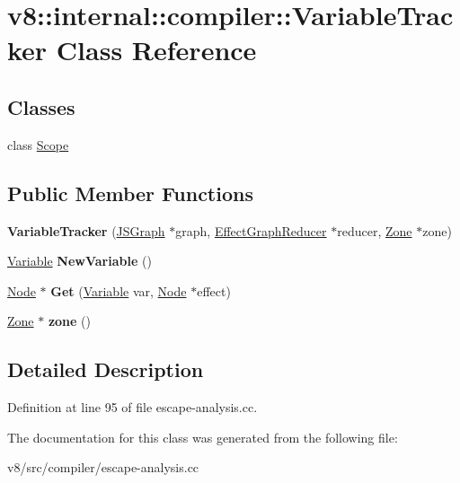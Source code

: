 \hypertarget{classv8_1_1internal_1_1compiler_1_1VariableTracker}{}\section{v8\+:\+:internal\+:\+:compiler\+:\+:Variable\+Tracker Class Reference}
\label{classv8_1_1internal_1_1compiler_1_1VariableTracker}
\subsection*{Classes}
\begin{DoxyCompactItemize}
\item 
class \mbox{\hyperlink{classv8_1_1internal_1_1compiler_1_1VariableTracker_1_1Scope}{Scope}}
\end{DoxyCompactItemize}
\subsection*{Public Member Functions}
\begin{DoxyCompactItemize}
\item 
\mbox{\label{classv8_1_1internal_1_1compiler_1_1VariableTracker_aebbffcea3f2367272c4b8d972bac9854}} 
{\bfseries Variable\+Tracker} (\mbox{\hyperlink{classv8_1_1internal_1_1compiler_1_1JSGraph}{J\+S\+Graph}} $\ast$graph, \mbox{\hyperlink{classv8_1_1internal_1_1compiler_1_1EffectGraphReducer}{Effect\+Graph\+Reducer}} $\ast$reducer, \mbox{\hyperlink{classv8_1_1internal_1_1Zone}{Zone}} $\ast$zone)
\item 
\mbox{\label{classv8_1_1internal_1_1compiler_1_1VariableTracker_a337576b218b4b405e37ad928b33ba606}} 
\mbox{\hyperlink{classv8_1_1internal_1_1compiler_1_1Variable}{Variable}} {\bfseries New\+Variable} ()
\item 
\mbox{\label{classv8_1_1internal_1_1compiler_1_1VariableTracker_a8a299cb8022a9ab6bb591682ec8c3b13}} 
\mbox{\hyperlink{classv8_1_1internal_1_1compiler_1_1Node}{Node}} $\ast$ {\bfseries Get} (\mbox{\hyperlink{classv8_1_1internal_1_1compiler_1_1Variable}{Variable}} var, \mbox{\hyperlink{classv8_1_1internal_1_1compiler_1_1Node}{Node}} $\ast$effect)
\item 
\mbox{\label{classv8_1_1internal_1_1compiler_1_1VariableTracker_a5405995761ed9401f97437718789b800}} 
\mbox{\hyperlink{classv8_1_1internal_1_1Zone}{Zone}} $\ast$ {\bfseries zone} ()
\end{DoxyCompactItemize}


\subsection{Detailed Description}


Definition at line 95 of file escape-\/analysis.\+cc.



The documentation for this class was generated from the following file\+:\begin{DoxyCompactItemize}
\item 
v8/src/compiler/escape-\/analysis.\+cc\end{DoxyCompactItemize}

